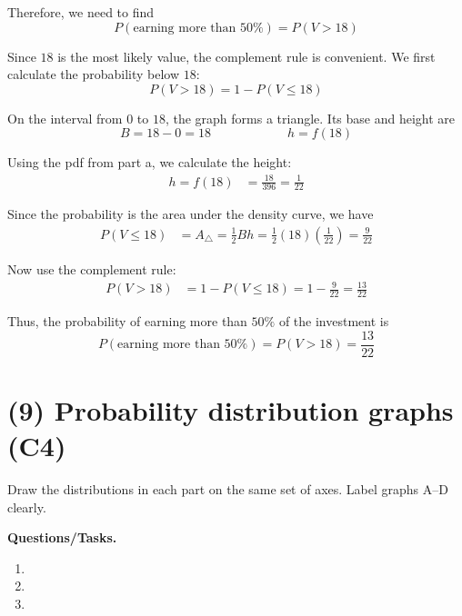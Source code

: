Therefore, we need to find
\[
P(\text{earning more than }50\%)=P(V>18)
\]

Since \(18\) is the most likely value, the complement rule is convenient. We first calculate the probability below \(18\):
\[
P(V>18)=1-P(V\le 18)
\]

On the interval from $0$ to $18$, the graph forms a triangle. Its base and height are
\[
B=18-0=18
\qquad \qquad \qquad
h=f(18)
\]

Using the pdf from part a, we calculate the height:
\[
\begin{aligned}
	h=f(18)
	&=\frac{18}{396}
	=\frac{1}{22}
\end{aligned}
\]

Since the probability is the area under the density curve, we have
\[
\begin{aligned}
	P(V\le 18)
	&=A_{\triangle}
	=\frac{1}{2}Bh
	=\frac{1}{2}(18)\left(\frac{1}{22}\right)
	=\frac{9}{22}
\end{aligned}
\]

Now use the complement rule:
\[
\begin{aligned}
	P(V>18)
	&=1-P(V\le 18)
	=1-\frac{9}{22}
	=\frac{13}{22}
\end{aligned}
\]

Thus, the probability of earning more than \(50\%\) of the investment is
\[
P(\text{earning more than }50\%)=P(V>18)=\frac{13}{22}
\]



\section{(9) Probability distribution graphs (C4)}
\label{sec:probability-distribution-graphs-c4}

Draw the distributions in each part on the same set of axes. Label graphs A--D clearly.

\textbf{Questions/Tasks.}
\begin{enumerate}[label=\textbf{\alph*)}]
	\item {}
	\item {}
	\item {}
\end{enumerate}


